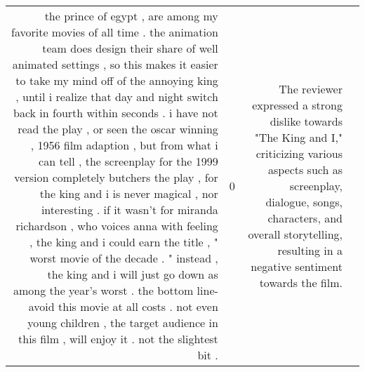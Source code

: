 \begin{tabular}{r{1cm} p{0.4in} r{1cm} p{0.4in}}
the prince of egypt , are among my favorite movies of all time .  the animation team does design their share of well animated settings , so this makes it easier to take my mind off of the annoying king , until i realize that day and night switch back in fourth within seconds .  i have not read the play , or seen the oscar winning , 1956 film adaption , but from what i can tell , the screenplay for the 1999 version completely butchers the play , for the king and i is never magical , nor interesting .  if it wasn't for miranda richardson , who voices anna with feeling , the king and i could earn the title , " worst movie of the decade . "  instead , the king and i will just go down as among the year's worst .  the bottom line- avoid this movie at all costs .  not even young children , the target audience in this film , will enjoy it .  not the slightest bit .   & 0 & The reviewer expressed a strong dislike towards "The King and I," criticizing various aspects such as screenplay, dialogue, songs, characters, and overall storytelling, resulting in a negative sentiment towards the film. \\

\end{tabular}
